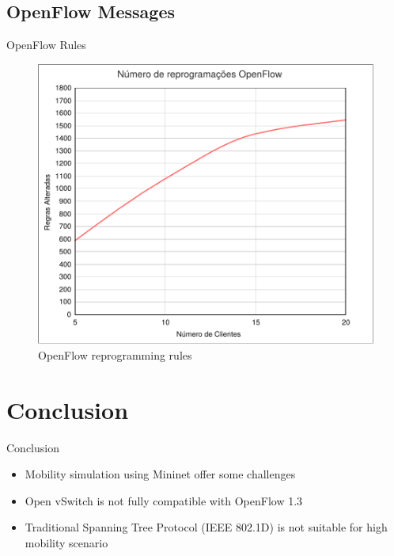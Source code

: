 \documentclass{beamer}
\begin{document}
\subsection{OpenFlow Messages}

\begin{frame}{OpenFlow Rules}
  \begin{figure}
    \includegraphics[scale=0.32]{images/graph_of.pdf}
    \caption{OpenFlow reprogramming rules}
  \end{figure}
\end{frame}


\section{Conclusion}

\begin{frame}{Conclusion}
\begin{itemize}
  \item Mobility simulation using Mininet offer some challenges
  \item Open vSwitch is not fully compatible with OpenFlow 1.3
  \item Traditional Spanning Tree Protocol (IEEE 802.1D) is not 
        suitable for high mobility scenario
\end{itemize}
\end{frame}
\end{document}

